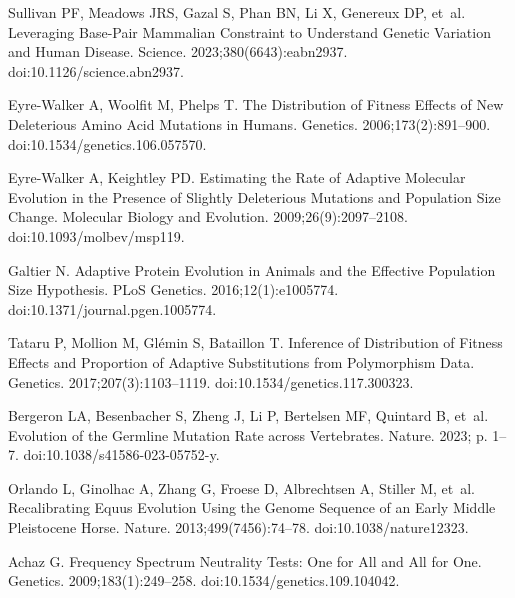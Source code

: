 \documentclass{article}
\begin{document}
\begin{thebibliography}{10}
        Sullivan PF, Meadows JRS, Gazal S, Phan BN, Li X, Genereux DP, et~al.
        \newblock Leveraging Base-Pair Mammalian Constraint to Understand Genetic
        Variation and Human Disease.
        \newblock Science. 2023;380(6643):eabn2937.
        \newblock doi:{10.1126/science.abn2937}.

        {Eyre-Walker} A, Woolfit M, Phelps T.
        \newblock The Distribution of Fitness Effects of New Deleterious Amino Acid
        Mutations in Humans.
        \newblock Genetics. 2006;173(2):891--900.
        \newblock doi:{10.1534/genetics.106.057570}.

        {Eyre-Walker} A, Keightley PD.
        \newblock Estimating the {{Rate}} of {{Adaptive Molecular Evolution}} in the
            {{Presence}} of {{Slightly Deleterious Mutations}} and {{Population Size
        Change}}.
        \newblock Molecular Biology and Evolution. 2009;26(9):2097--2108.
        \newblock doi:{10.1093/molbev/msp119}.

        Galtier N.
        \newblock Adaptive Protein Evolution in Animals and the Effective Population
        Size Hypothesis.
        \newblock PLoS Genetics. 2016;12(1):e1005774.
        \newblock doi:{10.1371/journal.pgen.1005774}.

        Tataru P, Mollion M, Gl{\'e}min S, Bataillon T.
        \newblock Inference of Distribution of Fitness Effects and Proportion of
        Adaptive Substitutions from Polymorphism Data.
        \newblock Genetics. 2017;207(3):1103--1119.
        \newblock doi:{10.1534/genetics.117.300323}.

        Bergeron LA, Besenbacher S, Zheng J, Li P, Bertelsen MF, Quintard B, et~al.
        \newblock Evolution of the Germline Mutation Rate across Vertebrates.
        \newblock Nature. 2023; p. 1--7.
        \newblock doi:{10.1038/s41586-023-05752-y}.

        Orlando L, Ginolhac A, Zhang G, Froese D, Albrechtsen A, Stiller M, et~al.
        \newblock Recalibrating {{Equus}} Evolution Using the Genome Sequence of an
        Early {{Middle Pleistocene}} Horse.
        \newblock Nature. 2013;499(7456):74--78.
        \newblock doi:{10.1038/nature12323}.

        Achaz G.
        \newblock Frequency {{Spectrum Neutrality Tests}}: {{One}} for {{All}} and
            {{All}} for {{One}}.
        \newblock Genetics. 2009;183(1):249--258.
        \newblock doi:{10.1534/genetics.109.104042}.


\end{thebibliography}
\end{document}
